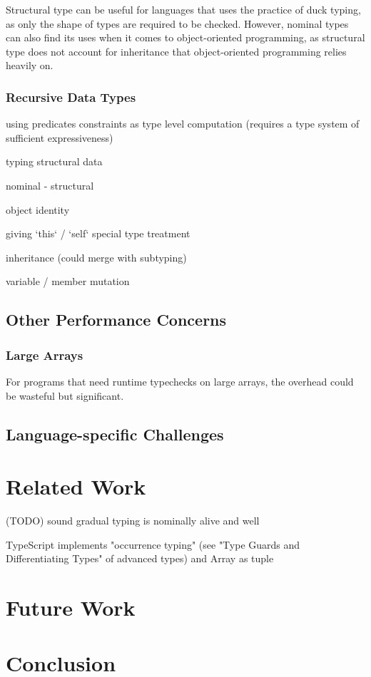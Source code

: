 Structural type can be useful for languages that uses the practice of duck typing, as only the shape of types are required to be checked.
However, nominal types can also find its uses when it comes to object-oriented programming,
as structural type does not account for inheritance that object-oriented programming relies heavily on.

\subsection{Recursive Data Types}

using predicates
constraints as type level computation (requires a type system of sufficient expressiveness)

typing structural data

nominal
- structural

object identity

giving `this` / `self` special type treatment

inheritance (could merge with subtyping)

variable / member mutation

\section{Other Performance Concerns}

\subsection{Large Arrays}

For programs that need runtime typechecks on large arrays,
the overhead could be wasteful but significant.

\section{Language-specific Challenges}

\renewcommand{\thechapter}{4}
\chapter{Related Work}

(TODO) sound gradual typing is nominally alive and well


TypeScript implements "occurrence typing" (see "Type Guards and Differentiating Types" of advanced types) and Array as tuple 
\renewcommand{\thechapter}{5}

\chapter{Future Work}

\renewcommand{\thechapter}{6}
\chapter{Conclusion}